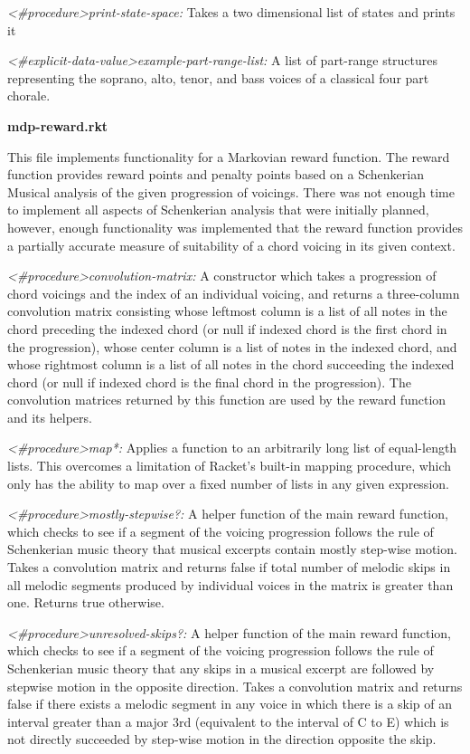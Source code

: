 \documentclass{chi2009}
\begin{document}
\textit{\textless\#procedure\textgreater print-state-space:}
Takes a two dimensional list of states and prints it

\textit{\textless\#explicit-data-value\textgreater example-part-range-list: }
A list of part-range structures representing the soprano, alto, tenor, and bass voices of a classical four part chorale.

\textbf{mdp-reward.rkt}

This file implements functionality for a Markovian reward function.  The reward function provides reward points and penalty points based on a Schenkerian Musical analysis of the given progression of voicings. There was not enough time to implement all aspects of Schenkerian analysis that were initially planned, however, enough functionality was implemented that the reward function provides a partially accurate measure of suitability of a chord voicing in its given context.

\textit{\textless\#procedure\textgreater convolution-matrix:} A constructor which takes a progression of chord voicings and the index of an individual voicing, and returns a three-column convolution matrix consisting whose leftmost column is a list of all notes in the chord preceding the indexed chord (or null if indexed chord is the first chord in the progression), whose center column is a list of notes in the indexed chord, and whose rightmost column is a list of all notes in the chord succeeding the indexed chord (or null if indexed chord is the final chord in the progression).  The convolution matrices returned by this function are used by the reward function and its helpers.

\textit{\textless\#procedure\textgreater map*:}
Applies a function to an arbitrarily long list of equal-length lists.  This overcomes a limitation of Racket's built-in mapping procedure, which only has the ability to map over a fixed number of lists in any given expression.


\textit{\textless\#procedure\textgreater mostly-stepwise?:}  A helper function of the main reward function, which checks to see if a segment of the voicing progression follows the rule of Schenkerian music theory that musical excerpts contain mostly step-wise motion. Takes a convolution matrix and returns false if total number of melodic skips in all melodic segments produced by individual voices in the matrix is greater than one.  Returns true otherwise.

\textit{\textless\#procedure\textgreater unresolved-skips?:}  A helper function of the main reward function, which checks to see if a segment of the voicing progression follows the rule of Schenkerian music theory that any skips in a musical excerpt are followed by stepwise motion in the opposite direction.  Takes a convolution matrix and returns false if there exists a melodic segment in any voice in which there is a skip of an interval greater than a major 3rd (equivalent to the interval of C to E) which is not directly succeeded by step-wise motion in the direction opposite the skip.
\end{document}
